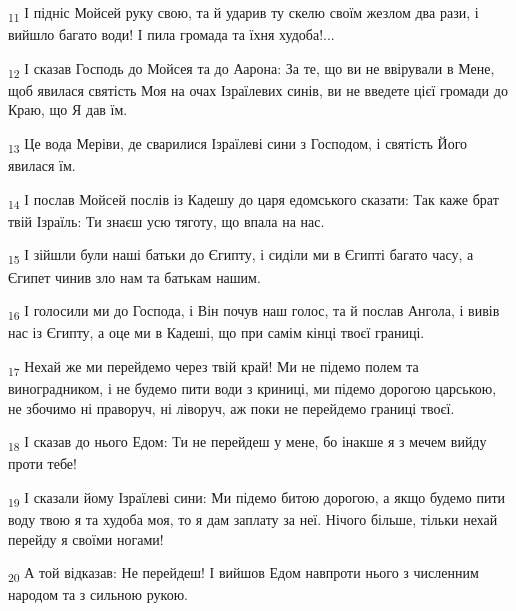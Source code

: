 \begin{tcolorbox}
\textsubscript{11} І підніс Мойсей руку свою, та й ударив ту скелю своїм жезлом два рази, і вийшло багато води! І пила громада та їхня худоба!...
\end{tcolorbox}
\begin{tcolorbox}
\textsubscript{12} І сказав Господь до Мойсея та до Аарона: За те, що ви не ввірували в Мене, щоб явилася святість Моя на очах Ізраїлевих синів, ви не введете цієї громади до Краю, що Я дав їм.
\end{tcolorbox}
\begin{tcolorbox}
\textsubscript{13} Це вода Меріви, де сварилися Ізраїлеві сини з Господом, і святість Його явилася їм.
\end{tcolorbox}
\begin{tcolorbox}
\textsubscript{14} І послав Мойсей послів із Кадешу до царя едомського сказати: Так каже брат твій Ізраїль: Ти знаєш усю тяготу, що впала на нас.
\end{tcolorbox}
\begin{tcolorbox}
\textsubscript{15} І зійшли були наші батьки до Єгипту, і сиділи ми в Єгипті багато часу, а Єгипет чинив зло нам та батькам нашим.
\end{tcolorbox}
\begin{tcolorbox}
\textsubscript{16} І голосили ми до Господа, і Він почув наш голос, та й послав Ангола, і вивів нас із Єгипту, а оце ми в Кадеші, що при самім кінці твоєї границі.
\end{tcolorbox}
\begin{tcolorbox}
\textsubscript{17} Нехай же ми перейдемо через твій край! Ми не підемо полем та виноградником, і не будемо пити води з криниці, ми підемо дорогою царською, не збочимо ні праворуч, ні ліворуч, аж поки не перейдемо границі твоєї.
\end{tcolorbox}
\begin{tcolorbox}
\textsubscript{18} І сказав до нього Едом: Ти не перейдеш у мене, бо інакше я з мечем вийду проти тебе!
\end{tcolorbox}
\begin{tcolorbox}
\textsubscript{19} І сказали йому Ізраїлеві сини: Ми підемо битою дорогою, а якщо будемо пити воду твою я та худоба моя, то я дам заплату за неї. Нічого більше, тільки нехай перейду я своїми ногами!
\end{tcolorbox}
\begin{tcolorbox}
\textsubscript{20} А той відказав: Не перейдеш! І вийшов Едом навпроти нього з численним народом та з сильною рукою.
\end{tcolorbox}
